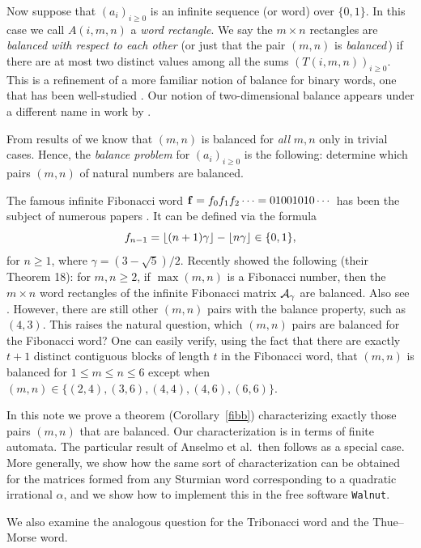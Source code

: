 \documentclass[final]{dmtcs-episciences}
\theoremstyle{plain}
\theoremstyle{remark}
\DeclarePairedDelimiter\floor{\lfloor}{\rfloor}
\begin{document}
Now suppose that $(a_i)_{i \geq 0}$ is an infinite sequence (or word) over $\{0,1 \}$.  In this case we call $A(i,m,n)$ a {\it word rectangle}.  We say the $m \times n$ rectangles are
{\it balanced with respect to each other\/} (or just that the pair $(m,n)$ is {\it balanced}\,) if there are at most two distinct values among all the sums $(T(i,m,n))_{i \geq 0}$.  This is a refinement of a more familiar notion of balance for
binary words, one that has been
well-studied \citep{Vuillon:2003}.  Our notion of two-dimensional balance appears under a different name in work by \cite{Puzynina:2019}.

From results of \cite{Berthe} we know that $(m,n)$ is balanced for {\it all\/} $m,n$ only in trivial cases.  Hence,
the {\it balance problem\/} for $(a_i)_{i \geq 0}$ is the following: determine  which pairs $(m,n)$
of natural numbers  are balanced. 

The famous infinite Fibonacci word ${\bf f} = f_0 f_1 f_2\cdots = 01001010\cdots$ has been the subject of numerous papers \citep{Berstel:1986b}.  It can be defined via the formula
\[
    f_{n-1} = \floor{(n+1)\gamma} - \floor{n \gamma} \in \{0,1\},
\]
for $n \geq 1$,
where $\gamma = (3- \sqrt{5})/2$.  
Recently \cite{Anselmo} showed the following (their Theorem 18):
for $m,n \geq 2$, if $\max(m,n)$ is a Fibonacci number, then the $m \times n$ word rectangles of the infinite Fibonacci matrix ${\cal A}_{\gamma}$ are balanced.  Also see \cite{Berthe}. However, there are still other $(m,n)$ pairs with the balance property, such as $(4,3)$.  This raises the natural question, which $(m,n)$ pairs are balanced for the Fibonacci word?  One can easily verify, using the fact that there are exactly $t+1$ distinct contiguous blocks of length $t$ in the Fibonacci word, that $(m,n)$ is balanced for $1 \leq m \leq n \leq 6$ except when $(m,n) \in\{ (2,4),(3,6),(4,4), (4,6), (6,6) \}$.

In this note we prove a theorem (Corollary~\ref{fibb}) characterizing exactly those pairs $(m,n)$ that are balanced.  Our characterization is in terms of finite automata.
The particular result of Anselmo et al.\ then follows as a special case.  More generally, we show how the same sort of characterization can be obtained for the matrices formed from any Sturmian word corresponding to a quadratic irrational $\alpha$, and we show how to implement this in the free software {\tt Walnut}.

We also examine the analogous question for the Tribonacci word and the Thue--Morse word.
\end{document}

